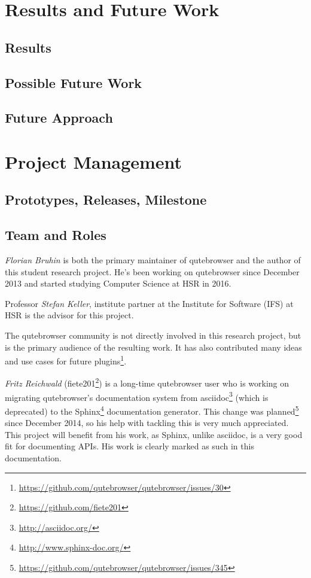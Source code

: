 \documentclass[a4paper,parskip=full]{scrreprt}
\begin{document}
\chapter{Results and Future Work}
\section{Results}
\section{Possible Future Work}
\section{Future Approach}

\chapter{Project Management}
\section{Prototypes, Releases, Milestone}

\section{Team and Roles}
\emph{Florian Bruhin} is both the primary maintainer of qutebrowser and the
author of this student research project. He's been working on qutebrowser since
December 2013 and started studying Computer Science at HSR in 2016.

Professor \emph{Stefan Keller}, institute partner at the Institute for Software
(IFS) at HSR is the advisor for this project.

The qutebrowser community is not directly involved in this research project, but
is the primary audience of the resulting work. It has also contributed many
ideas and use cases for future
plugins\footnote{\url{https://github.com/qutebrowser/qutebrowser/issues/30}}.

\emph{Fritz Reichwald} (fiete201\footnote{\url{https://github.com/fiete201}})
is a long-time qutebrowser user who is working on migrating qutebrowser's
documentation system from asciidoc\footnote{\url{http://asciidoc.org/}} (which
is deprecated) to the Sphinx\footnote{\url{http://www.sphinx-doc.org/}}
documentation generator. This change was
planned\footnote{\url{https://github.com/qutebrowser/qutebrowser/issues/345}}
since December 2014, so his help with tackling this is very much appreciated.
This project will benefit from his work, as Sphinx, unlike asciidoc, is a
very good fit for documenting APIs. His work is clearly marked as such in this
documentation.
\end{document}
